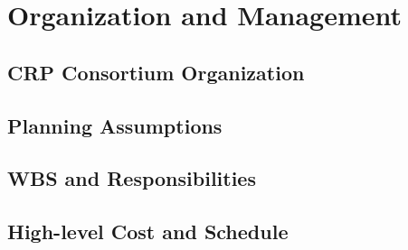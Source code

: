 \section{Organization and Management}
\label{sec:fddp-crp-org}

\subsection{CRP Consortium Organization}
\label{sec:fddp-crp-org-consortium}


\subsection{Planning Assumptions}
\label{sec:fddp-crp-org-assmp}


\subsection{WBS and Responsibilities}
\label{sec:fddp-crp-org-wbs}

\subsection{High-level Cost and Schedule}
\label{sec:fddp-crp-org-cs}














